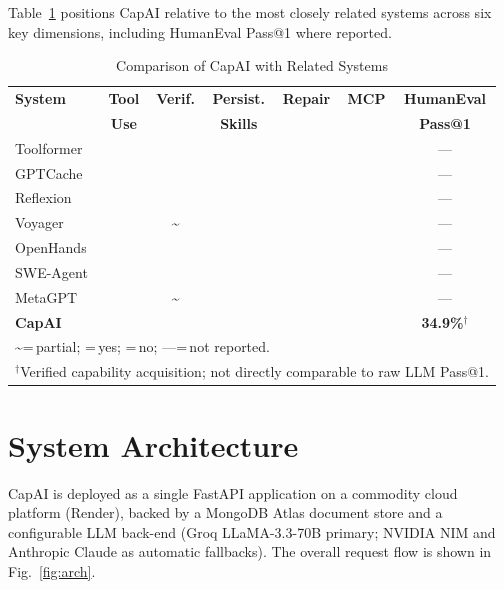 \documentclass[conference]{IEEEtran}
\newcommand{\cmark}{\ding{51}}
\newcommand{\xmark}{\ding{55}}
\newcommand{\pmark}{\textasciitilde}
\begin{document}
Table~\ref{tab:comparison} positions CapAI relative to the most closely
related systems across six key dimensions, including HumanEval Pass@1
where reported.

\begin{table}[htbp]
  \centering
  \caption{Comparison of CapAI with Related Systems}
  \label{tab:comparison}
  \renewcommand{\arraystretch}{1.2}
  \begin{tabular}{lcccccc}
    \toprule
    \textbf{System}
      & \textbf{Tool} & \textbf{Verif.}
      & \textbf{Persist.} & \textbf{Repair} & \textbf{MCP}
      & \textbf{HumanEval} \\
      & \textbf{Use}  &
      & \textbf{Skills}   &                 &
      & \textbf{Pass@1} \\
    \midrule
    Toolformer     & \cmark & \xmark & \xmark & \xmark & \xmark & --- \\
    GPTCache       & \cmark & \xmark & \cmark & \xmark & \xmark & --- \\
    Reflexion      & \cmark & \cmark & \xmark & \cmark & \xmark & --- \\
    Voyager        & \cmark & \pmark & \cmark & \cmark & \xmark & --- \\
    OpenHands      & \cmark & \cmark & \xmark & \cmark & \xmark & --- \\
    SWE-Agent      & \cmark & \cmark & \xmark & \cmark & \xmark & --- \\
    MetaGPT        & \cmark & \pmark & \xmark & \cmark & \xmark & --- \\
    \textbf{CapAI} & \cmark & \cmark & \cmark & \cmark & \cmark
      & \textbf{34.9\%}$^\dagger$ \\
    \bottomrule
    \multicolumn{7}{l}{\footnotesize\pmark\;=\,partial; \cmark\;=\,yes;
      \xmark\;=\,no; ---\;=\,not reported.} \\
    \multicolumn{7}{l}{\footnotesize $^\dagger$Verified capability
      acquisition; not directly comparable to raw LLM Pass@1.}
  \end{tabular}
\end{table}

\section{System Architecture}
\label{sec:architecture}

CapAI is deployed as a single FastAPI application on a commodity cloud
platform (Render), backed by a MongoDB Atlas document store and a
configurable LLM back-end (Groq LLaMA-3.3-70B primary; NVIDIA NIM and
Anthropic Claude as automatic fallbacks).
The overall request flow is shown in Fig.~\ref{fig:arch}.
\end{document}
